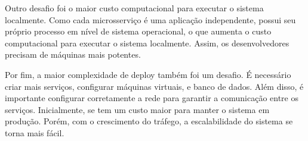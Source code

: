 Outro desafio foi o maior custo computacional para executar o sistema localmente. Como cada microsserviço é uma aplicação independente, possui seu próprio processo em nível de sistema operacional, o que aumenta o custo computacional para executar o sistema localmente. Assim, os desenvolvedores precisam de máquinas mais potentes.

Por fim, a maior complexidade de deploy também foi um desafio. É necessário criar mais serviços, configurar máquinas virtuais,  e banco de dados. Além disso, é importante configurar corretamente a rede para garantir a comunicação entre os serviços. Inicialmente, se tem um custo maior para manter o sistema em produção. Porém, com o crescimento do tráfego, a escalabilidade do sistema se torna mais fácil.